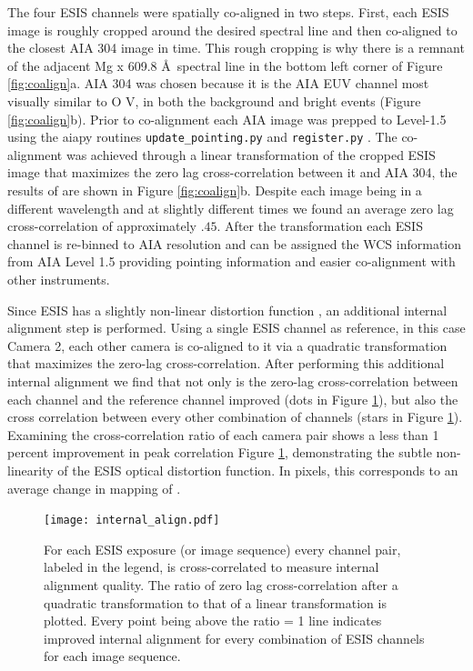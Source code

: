    		The four ESIS channels were spatially co-aligned in two steps.  
   		First, each ESIS image is roughly cropped around the desired spectral line and then co-aligned to the closest AIA 304 image in time.
   		This rough cropping is why there is a remnant of the adjacent Mg {\sc x} 609.8 \AA \ spectral line in the bottom left corner of Figure \ref{fig:coalign}a.
   		AIA 304 was chosen because it is the AIA EUV channel most visually similar to O V, in both the background and bright events (Figure \ref{fig:coalign}b).
   		Prior to co-alignment each AIA image was prepped to Level-1.5 using the aiapy routines \texttt{update\_pointing.py} and \texttt{register.py} \citep{aiapy}.
   		The co-alignment was achieved through a linear transformation of the cropped ESIS image that maximizes the zero lag cross-correlation between it and AIA 304, the results of are shown in Figure \ref{fig:coalign}b.
   		Despite each image being in a different wavelength and at slightly different times we found an average zero lag cross-correlation of approximately $.45$.
   		After the transformation each ESIS channel is re-binned to AIA resolution and can be assigned the WCS information from AIA Level 1.5 providing pointing information and easier co-alignment with other instruments.

    	Since ESIS has a slightly non-linear distortion function \citep{ESIS}, an additional internal alignment step is performed.
    	Using a single ESIS channel as reference, in this case Camera 2, each other camera is co-aligned to it via a quadratic transformation that maximizes the zero-lag cross-correlation. 
    	After performing this additional internal alignment we find that not only is the zero-lag cross-correlation between each channel and the reference channel improved (dots in Figure \ref{fig:cc}), but also the cross correlation between every other combination of channels (stars in Figure \ref{fig:cc}).
    	Examining the cross-correlation ratio of each camera pair shows a less than 1 percent improvement in peak correlation Figure \ref{fig:cc}, demonstrating the subtle non-linearity of the ESIS optical distortion function.
    	In pixels, this corresponds to an average change in mapping of .
    	
    	\begin{figure}[htb!]
    		\centering
    		\texttt{[image: internal\_align.pdf]}
    		\caption{For each ESIS exposure (or image sequence) every channel pair, labeled in the legend, is cross-correlated to measure internal alignment quality.  The ratio of zero lag cross-correlation after a quadratic transformation to that of a linear transformation is plotted.  Every point being above the ratio = 1 line indicates improved internal alignment for every combination of ESIS channels for each image sequence.}
    		\label{fig:cc}	
    	\end{figure}
    	
